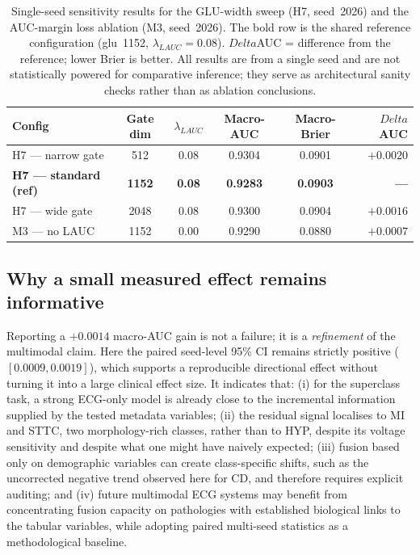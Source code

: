 \documentclass[mathematics,article,submit,pdftex]{Definitions/mdpi}
\def\mathrm#1{#1}%
\def\bm#1{#1}%
\def\Delta{Delta }%
\begin{document}
\begin{table}[H]
\caption{Single-seed sensitivity results for the GLU-width sweep (H7, seed~2026) and the AUC-margin loss ablation (M3, seed~2026). The bold row is the shared reference configuration (glu~1152, $\lambda_{\mathrm{LAUC}}{=}0.08$). $\Delta$AUC = difference from the reference; lower Brier is better. All results are from a single seed and are not statistically powered for comparative inference; they serve as architectural sanity checks rather than as ablation conclusions.}\label{tab:sensitivity}
\small\centering
\begin{tabular}{lccccr}
\toprule
\textbf{Config} & \textbf{Gate dim} & $\bm{\lambda}_{\mathrm{LAUC}}$ & \textbf{Macro-AUC} & \textbf{Macro-Brier} & $\bm{\Delta}$\textbf{AUC} \\
\midrule
H7 — narrow gate       & 512  & 0.08 & 0.9304 & 0.0901 & $+0.0020$ \\
\textbf{H7 — standard (ref)} & \textbf{1152} & \textbf{0.08} & \textbf{0.9283} & \textbf{0.0903} & \textbf{—} \\
H7 — wide gate         & 2048 & 0.08 & 0.9300 & 0.0904 & $+0.0016$ \\
M3 — no LAUC           & 1152 & 0.00 & 0.9290 & 0.0880 & $+0.0007$ \\
\bottomrule
\end{tabular}
\end{table}

\subsection{Why a small measured effect remains informative}
Reporting a $+0.0014$ macro-AUC gain is not a failure; it is a \emph{refinement} of the multimodal claim. Here the paired seed-level 95\% CI remains strictly positive ($[0.0009, 0.0019]$), which supports a reproducible directional effect without turning it into a large clinical effect size. It indicates that: (i) for the superclass task, a strong ECG-only model is already close to the incremental information supplied by the tested metadata variables; (ii) the residual signal localises to MI and STTC, two morphology-rich classes, rather than to HYP, despite its voltage sensitivity and despite what one might have naively expected; (iii) fusion based only on demographic variables can create class-specific shifts, such as the uncorrected negative trend observed here for CD, and therefore requires explicit auditing; and (iv) future multimodal ECG systems may benefit from concentrating fusion capacity on pathologies with established biological links to the tabular variables, while adopting paired multi-seed statistics as a methodological baseline.
\end{document}
